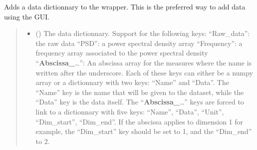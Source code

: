 \documentclass[letterpaper,10pt,english]{sphinxmanual}
\begin{document}
\begin{fulllineitems}
\begin{fulllineitems}
\begin{sphinxVerbatim}[commandchars=\\\{\}]
          
\end{sphinxVerbatim}

\end{fulllineitems}


\begin{fulllineitems}
\label{\detokenize{source/_autosummary/HDF5_BLS.Wrapper:HDF5_BLS.Wrapper.add_dictionnary}}
\pysigstartsignatures
\pysiglinewithargsret
{}
{\sphinxparamcomma {}\sphinxparamcomma {}\sphinxparamcomma {}\sphinxparamcomma {}}
{}
\pysigstopsignatures
\sphinxAtStartPar
Adds a data dictionnary to the wrapper. This is the preferred way to add data using the GUI.
\begin{quote}\begin{description}
\begin{itemize}
\item {} 
\sphinxAtStartPar
{} () \textendash{} The data dictionnary. Support for the following keys:
\sphinxhyphen{} “Raw\_data”: the raw data
\sphinxhyphen{} “PSD”: a power spectral density array
\sphinxhyphen{} “Frequency”: a frequency array associated to the power spectral density
\sphinxhyphen{} “{\color{red}\bfseries{}Abscissa\_}…”: An abscissa array for the measures where the name is written after the underscore.
Each of these keys can either be a numpy array or a dictionnary with two keys: “Name” and “Data”. The “Name” key is the name that will be given to the dataset, while the “Data” key is the data itself.
The “{\color{red}\bfseries{}Abscissa\_}…” keys are forced to link to a dictionnary with five keys: “Name”, “Data”, “Unit”, “Dim\_start”, “Dim\_end”. If the abscissa applies to dimension 1 for example, the “Dim\_start” key should be set to 1, and the “Dim\_end” to 2.


\end{itemize}
\end{description}
\end{quote}
\end{fulllineitems}
\end{fulllineitems}
\end{document}

